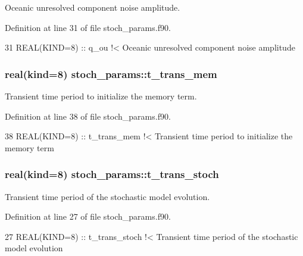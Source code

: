 Oceanic unresolved component noise amplitude. 



Definition at line 31 of file stoch\+\_\+params.\+f90.


\begin{DoxyCode}
31   \textcolor{keywordtype}{REAL(KIND=8)} :: q\_ou\textcolor{comment}{               !< Oceanic unresolved component noise amplitude}
\end{DoxyCode}
\subsubsection[{\texorpdfstring{t\+\_\+trans\+\_\+mem}{t_trans_mem}}]{\setlength{\rightskip}{0pt plus 5cm}real(kind=8) stoch\+\_\+params\+::t\+\_\+trans\+\_\+mem}\hypertarget{namespacestoch__params_aad7f7a2481dfb730a051ae2e0de9494c}{}\label{namespacestoch__params_aad7f7a2481dfb730a051ae2e0de9494c}


Transient time period to initialize the memory term. 



Definition at line 38 of file stoch\+\_\+params.\+f90.


\begin{DoxyCode}
38   \textcolor{keywordtype}{REAL(KIND=8)} :: t\_trans\_mem\textcolor{comment}{        !< Transient time period to initialize the memory term}
\end{DoxyCode}
\subsubsection[{\texorpdfstring{t\+\_\+trans\+\_\+stoch}{t_trans_stoch}}]{\setlength{\rightskip}{0pt plus 5cm}real(kind=8) stoch\+\_\+params\+::t\+\_\+trans\+\_\+stoch}\hypertarget{namespacestoch__params_a11aa6b888c2b4005aca690fb78e2c785}{}\label{namespacestoch__params_a11aa6b888c2b4005aca690fb78e2c785}


Transient time period of the stochastic model evolution. 



Definition at line 27 of file stoch\+\_\+params.\+f90.


\begin{DoxyCode}
27   \textcolor{keywordtype}{REAL(KIND=8)} :: t\_trans\_stoch\textcolor{comment}{      !< Transient time period of the stochastic model evolution}
\end{DoxyCode}

